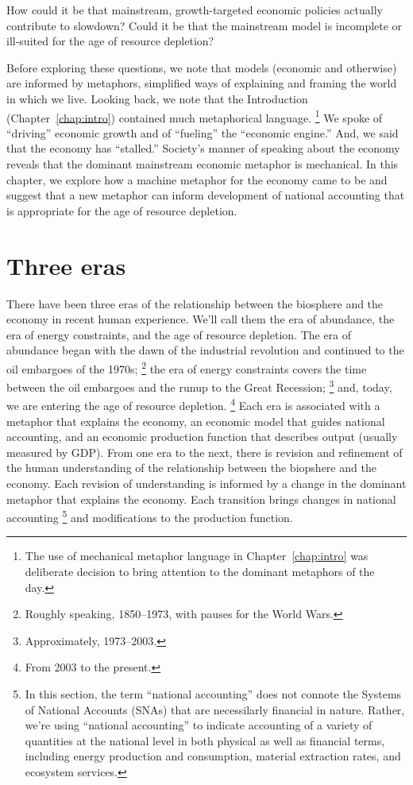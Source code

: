 How could it be that mainstream, growth-targeted
economic policies actually contribute to slowdown?
Could it be that the mainstream model is incomplete 
or ill-suited for the age of resource depletion?

Before exploring these questions, we note that 
models (economic and otherwise) are informed by metaphors,
simplified ways of explaining and framing the world in which we live.
Looking back, we note that the Introduction (Chapter~\ref{chap:intro})
contained much metaphorical language.%
	\footnote{
	The use of mechanical metaphor language in Chapter~\ref{chap:intro} 
	was deliberate decision to bring attention 
	to the dominant metaphors of the day.
	}
We spoke of 
``driving'' economic growth
and of ``fueling'' the ``economic engine.''
And, we said that the economy has ``stalled.''
Society's manner of speaking about the economy 
reveals that the dominant mainstream economic metaphor 
is mechanical.
In this chapter, we explore how a machine metaphor for the economy
came to be and suggest that a new metaphor 
can inform development of national accounting 
that is appropriate for the age of resource depletion.


\section{Three eras}
\label{sec:three_eras}

There have been three eras 
of the relationship between the biosphere and the economy
in recent human experience.
We'll call them 
the era of abundance, 
the era of energy constraints, and 
the age of resource depletion.
The era of abundance began 
with the dawn of the industrial revolution
and continued to the oil embargoes of the 1970s;%
	\footnote{
	Roughly speaking, 1850--1973,
	with pauses for the World Wars.
	}
the era of energy constraints covers
the time between the oil embargoes and 
the runup to the Great Recession;%
	\footnote{
	Approximately, 1973--2003.
	}
and, today, we are entering the age of resource depletion.%
	\footnote{
	From 2003 to the present.
	}
Each era is associated with 
a metaphor that explains the economy,
an economic model that guides national accounting, and
an economic production function that describes output 
(usually measured by GDP).
From one era to the next, there is revision and refinement 
of the human understanding of the relationship between the biopshere and the economy.
Each revision of understanding is informed by a change in the dominant metaphor
that explains the economy.
Each transition brings changes in national accounting%
	\footnote{
	In this section, 
	the term ``national accounting'' does not connote the
	Systems of National Accounts (SNAs) that are necessilarly financial in nature.
	Rather, we're using ``national accounting'' to indicate
	accounting of a variety of quantities at the national level
	in both physical as well as financial terms, 
	including energy production and consumption, 
	material extraction rates,
	and ecosystem services.
	}
and modifications to the production function.

